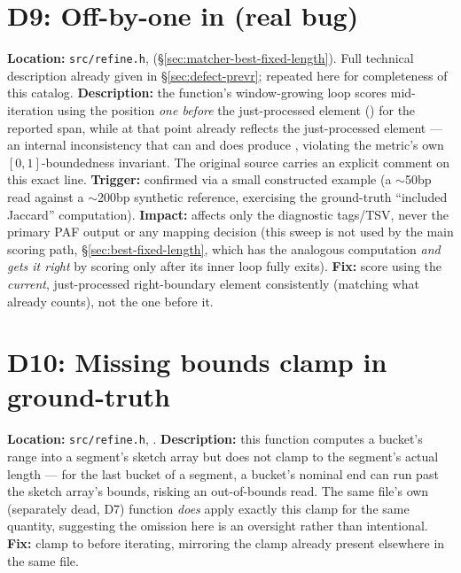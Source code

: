 \section{D9: Off-by-one in  (real bug)}
\label{sec:d9}
\textbf{Location:} \texttt{src/refine.h}, 
(\S\ref{sec:matcher-best-fixed-length}). Full technical description already given in
\S\ref{sec:defect-prevr}; repeated here for completeness of this catalog. \textbf{Description:}
the function's window-growing loop scores mid-iteration using the position \emph{one before} the
just-processed element () for the reported span, while  at that
point already reflects the just-processed element --- an internal inconsistency that can and does
produce , violating the metric's own $[0,1]$-boundedness invariant. The
original source carries an explicit  comment on this
exact line. \textbf{Trigger:} confirmed via a small constructed example (a $\sim$50bp read against
a $\sim$200bp synthetic reference, exercising the  ground-truth ``included Jaccard''
computation). \textbf{Impact:} affects only the  diagnostic tags/TSV, never the primary
PAF output or any mapping decision (this sweep is not used by the main scoring path,
\S\ref{sec:best-fixed-length}, which has the analogous computation \emph{and gets it right} by
scoring only after its inner loop fully exits). \textbf{Fix:} score using the \emph{current},
just-processed right-boundary element consistently (matching what  already
counts), not the one before it.

\section{D10: Missing bounds clamp in ground-truth }
\label{sec:d10}
\textbf{Location:} \texttt{src/refine.h}, . \textbf{Description:}
this function computes a bucket's \code{[start, end)} range into a segment's sketch array but does
not clamp  to the segment's actual length --- for the last bucket of a segment, a
bucket's nominal end can run past the sketch array's bounds, risking an out-of-bounds read. The
same file's own (separately dead, D7)  function \emph{does} apply exactly this
clamp for the same quantity, suggesting the omission here is an oversight rather than intentional.
\textbf{Fix:} clamp  to  before iterating, mirroring
the clamp already present elsewhere in the same file.

